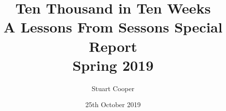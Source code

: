 \documentclass{book}
\begin{document}



\title{Ten Thousand in Ten Weeks\\
  A Lessons From Sessons Special Report\\
  Spring 2019
}
\author{Stuart Cooper}
\date{25th October 2019}

\end{document}

